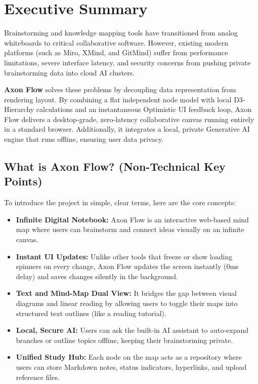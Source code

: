 \documentclass[12pt, a4paper]{article}
\begin{document}
\newpage
{}

\section{Executive Summary}

Brainstorming and knowledge mapping tools have transitioned from analog whiteboards to critical collaborative software. However, existing modern platforms (such as Miro, XMind, and GitMind) suffer from performance limitations, severe interface latency, and security concerns from pushing private brainstorming data into cloud AI clusters.

\textbf{Axon Flow} solves these problems by decoupling data representation from rendering layout. By combining a flat independent node model with local D3-Hierarchy calculations and an instantaneous Optimistic UI feedback loop, Axon Flow delivers a desktop-grade, zero-latency collaborative canvas running entirely in a standard browser. Additionally, it integrates a local, private Generative AI engine that runs offline, ensuring user data privacy.

\subsection{What is Axon Flow? (Non-Technical Key Points)}
To introduce the project in simple, clear terms, here are the core concepts:
\begin{itemize}[label=\small$\bullet$, leftmargin=15pt]
  \item \textbf{Infinite Digital Notebook:} Axon Flow is an interactive web-based mind map where users can brainstorm and connect ideas visually on an infinite canvas.
  \item \textbf{Instant UI Updates:} Unlike other tools that freeze or show loading spinners on every change, Axon Flow updates the screen instantly (0ms delay) and saves changes silently in the background.
  \item \textbf{Text and Mind-Map Dual View:} It bridges the gap between visual diagrams and linear reading by allowing users to toggle their maps into structured text outlines (like a reading tutorial).
  \item \textbf{Local, Secure AI:} Users can ask the built-in AI assistant to auto-expand branches or outline topics offline, keeping their brainstorming private.
  \item \textbf{Unified Study Hub:} Each node on the map acts as a repository where users can store Markdown notes, status indicators, hyperlinks, and upload reference files.
\end{itemize}
\end{document}

